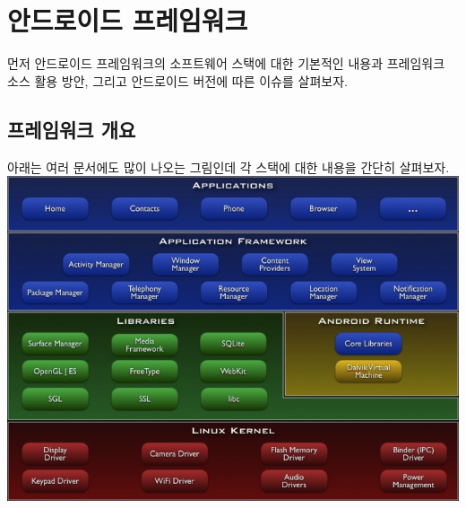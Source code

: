 \chapter{안드로이드 프레임워크}
먼저 안드로이드 프레임워크의 소프트웨어 스택에 대한 기본적인 내용과 프레임워크 소스 활용 방안, 그리고 안드로이드 버전에 따른 이슈를 살펴보자.

\section{프레임워크 개요}
아래는 여러 문서에도 많이 나오는 그림인데 각 스택에 대한 내용을 간단히 살펴보자.\\

\includegraphics[scale=0.65]{system-architecture}
